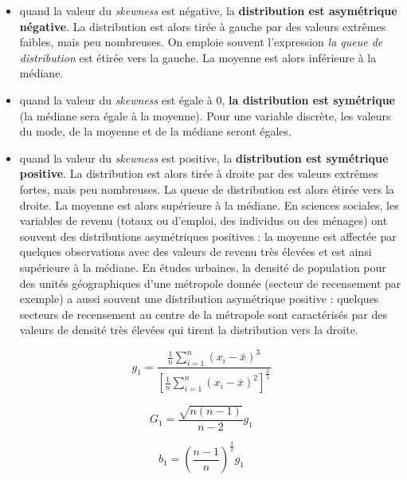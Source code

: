 \documentclass[
  11pt,
  french,
]{book}
\providecommand{\tightlist}{%
  \setlength{\itemsep}{0pt}\setlength{\parskip}{0pt}}
\begin{document}
\begin{itemize}
\tightlist
\item
  quand la valeur du \emph{skewness} est négative, la \textbf{distribution est asymétrique négative}. La distribution est alors tirée à gauche par des valeurs extrêmes faibles, mais peu nombreuses. On emploie souvent l'expression \emph{la queue de distribution} est étirée vers la gauche. La moyenne est alors inférieure à la médiane.
\item
  quand la valeur du \emph{skewness} est égale à 0, \textbf{la distribution est symétrique} (la médiane sera égale à la moyenne). Pour une variable discrète, les valeurs du mode, de la moyenne et de la médiane seront égales.
\item
  quand la valeur du \emph{skewness} est positive, la \textbf{distribution est symétrique positive}. La distribution est alors tirée à droite par des valeurs extrêmes fortes, mais peu nombreuses. La queue de distribution est alors étirée vers la droite. La moyenne est alors supérieure à la médiane. En sciences sociales, les variables de revenu (totaux ou d'emploi, des individus ou des ménages) ont souvent des distributions asymétriques positives : la moyenne est affectée par quelques observations avec des valeurs de revenu très élevées et est ainsi supérieure à la médiane. En études urbaines, la densité de population pour des unités géographiques d'une métropole donnée (secteur de recensement par exemple) a aussi souvent une distribution asymétrique positive : quelques secteurs de recensement au centre de la métropole sont caractérisés par des valeurs de densité très élevées qui tirent la distribution vers la droite.
\end{itemize}

\footnotesize

\begin{equation}  
g_1=\frac{ \frac{1}{n} \sum_{i=1}^n(x_i-\bar{x})^3} { \left[\frac{1}{n}\sum_{i=1}^n(x_i-\bar{x})^2\right] ^\frac{3}{2}}
\label{eq:SkewType1}
\end{equation}
\normalsize

\footnotesize

\begin{equation}  
G_1= \frac{\sqrt{n(n-1)}}{n-2} g_1
\label{eq:SkewType2}
\end{equation}
\normalsize

\footnotesize

\begin{equation}  
b_1= \left( \frac{n-1}{n} \right) ^\frac{3}{2} g_1
\label{eq:SkewType3}
\end{equation}
\normalsize
\end{document}
